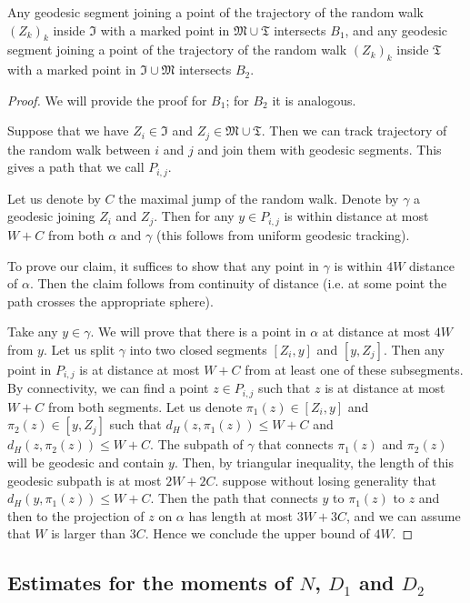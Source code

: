 \begin{lem} Any geodesic segment joining a point of the trajectory of the random walk $(Z_k)_k$ inside $\mathfrak{I}$ with a marked point in $\mathfrak{M} \cup \mathfrak{T}$ intersects $B_1$, and any geodesic segment joining a  point of the trajectory of the random walk $(Z_k)_k$ inside $\mathfrak{T}$ with a marked point in $\mathfrak{I}\cup \mathfrak{M}$ intersects $B_2$.	
\end{lem}
\begin{proof}
	We will provide the proof for $B_1$; for $B_2$ it is analogous.
	
	Suppose that we have $Z_i\in \mathfrak{I}$ and $Z_j\in \mathfrak{M}\cup \mathfrak{T}$. Then we can track trajectory of the random walk between $i$ and $j$ and join them with geodesic segments. This gives a path that we call $P_{i,j}$.
	
	Let us denote by $C$ the maximal jump of the random walk. Denote by $\gamma$ a geodesic joining $Z_i$ and $Z_j$. Then for any $y\in P_{i,j}$ is within distance at most $W+C$ from both $\alpha$ and $\gamma$ (this follows from uniform geodesic tracking).
	
	To prove our claim, it suffices to show that any point in $\gamma$ is within $4W$ distance of $\alpha$. Then the claim follows from continuity of distance (i.e. at some point the path crosses the appropriate sphere).
	
	Take any $y\in \gamma$. We will prove that there is a point in $\alpha$ at distance at most $4W$ from $y$. Let us split $\gamma$ into two closed segments $[Z_i,y]$ and $[y,Z_j]$. Then any point in $P_{i,j}$ is at distance at most $W+C$ from at least one of these subsegments. By connectivity, we can find a point $z\in P_{i,j}$ such that $z$ is at distance at most $W+C$ from both segments. Let us denote $\pi_1(z)\in [Z_i,y]$ and $\pi_2(z)\in [y,Z_j]$ such that $d_H(z,\pi_1(z))\le W+C$ and $d_H(z,\pi_2(z))\le W+C$. The subpath of $\gamma$ that connects $\pi_1(z)$ and $\pi_2(z)$ will be geodesic and contain $y$. Then, by triangular inequality, the length of this geodesic subpath is at most $2W+2C$. suppose without losing generality that $d_H(y,\pi_1(z))\le W+C$. Then the path that connects $y$ to $\pi_1(z)$ to $z$ and then to the projection of $z$ on $\alpha$ has length at most $3W+3C$, and we can assume that $W$ is larger than $3C$. Hence we conclude the upper bound of $4W$.
\end{proof}


\subsection{Estimates for the moments of $N$, $D_1$ and $D_2$}

